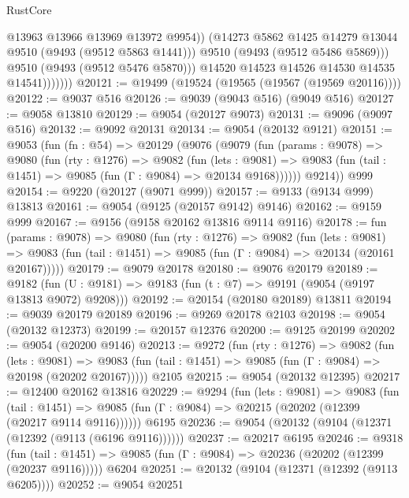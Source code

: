 \begin{lexlean}{RustCore}
\begin{coremodule}
                          @13963
                          @13966
                          @13969
                          @13972
                          @9954))
                      (@14273 @5862 @1425 @14279 @13044 @9510 (@9493 (@9512 @5863 @1441)))
                      @9510
                      (@9493 (@9512 @5486 @5869)))
                    @9510
                    (@9493 (@9512 @5476 @5870)))
                  @14520
                  @14523
                  @14526
                  @14530
                  @14535
                  @14541)))))))
@20121 := @19499 (@19524 (@19565 (@19567 (@19569 @20116))))
@20122 := @9037 @516
@20126 := @9039 (@9043 @516) (@9049 @516)
@20127 := @9058 @13810
@20129 := @9054 (@20127 @9073)
@20131 := @9096 (@9097 @516)
@20132 := @9092 @20131
@20134 := @9054 (@20132 @9121)
@20151 := @9053
    (fun (fn : @54) =>
    @20129
      (@9076
        (@9079
          (fun (params : @9078) =>
          @9080
            (fun (rty : @1276) =>
            @9082
              (fun (lets : @9081) =>
              @9083 (fun (tail : @1451) => @9085 (fun (Γ : @9084) => @20134 @9168))))))
        @9214))
    @999
@20154 := @9220 (@20127 (@9071 @999))
@20157 := @9133 (@9134 @999) @13813
@20161 := @9054 (@9125 (@20157 @9142) @9146)
@20162 := @9159 @999
@20167 := @9156 (@9158 @20162 @13816 @9114 @9116)
@20178 := fun (params : @9078) =>
  @9080
    (fun (rty : @1276) =>
    @9082
      (fun (lets : @9081) =>
      @9083 (fun (tail : @1451) => @9085 (fun (Γ : @9084) => @20134 (@20161 @20167)))))
@20179 := @9079 @20178
@20180 := @9076 @20179
@20189 := @9182
    (fun (U : @9181) => @9183 (fun (t : @7) => @9191 (@9054 (@9197 @13813 @9072) @9208)))
@20192 := @20154 (@20180 @20189) @13811
@20194 := @9039 @20179 @20189
@20196 := @9269 @20178 @2103
@20198 := @9054 (@20132 @12373)
@20199 := @20157 @12376
@20200 := @9125 @20199
@20202 := @9054 (@20200 @9146)
@20213 := @9272
    (fun (rty : @1276) =>
    @9082
      (fun (lets : @9081) =>
      @9083 (fun (tail : @1451) => @9085 (fun (Γ : @9084) => @20198 (@20202 @20167)))))
    @2105
@20215 := @9054 (@20132 @12395)
@20217 := @12400 @20162 @13816
@20229 := @9294
    (fun (lets : @9081) =>
    @9083
      (fun (tail : @1451) =>
      @9085 (fun (Γ : @9084) => @20215 (@20202 (@12399 (@20217 @9114 @9116))))))
    @6195
@20236 := @9054 (@20132 (@9104 (@12371 (@12392 (@9113 (@6196 @9116))))))
@20237 := @20217 @6195
@20246 := @9318
    (fun (tail : @1451) => @9085 (fun (Γ : @9084) => @20236 (@20202 (@12399 (@20237 @9116)))))
    @6204
@20251 := @20132 (@9104 (@12371 (@12392 (@9113 @6205))))
@20252 := @9054 @20251

\end{coremodule}
\end{lexlean}
